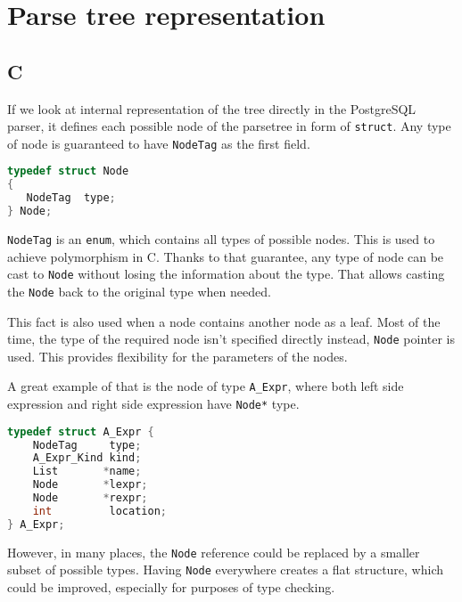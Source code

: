 \section{Parse tree representation}
\subsection{C}

If we look at internal representation of the tree directly in the PostgreSQL parser, it defines each possible node of the parsetree in form of \texttt{struct}. Any type of node is guaranteed to have \texttt{NodeTag} as the first field. 
\begin{lstlisting}[language=C, basicstyle=\ttfamily]      
typedef struct Node
{
   NodeTag  type;
} Node;
\end{lstlisting}
\texttt{NodeTag} is an \texttt{enum}, which contains all types of possible nodes. This is used to achieve polymorphism in C. Thanks to that guarantee, any type of node can be cast to \texttt{Node} without losing the information about the type. That allows casting the \texttt{Node} back to the original type when needed.

This fact is also used when a node contains another node as a leaf. Most of the time, the type of the required node isn't specified directly instead, \texttt{Node} pointer is used. This provides flexibility for the parameters of the nodes. 

A great example of that is the node of type \texttt{A\_Expr}, where both left side expression and right side expression have \texttt{Node*} type.
\begin{lstlisting}[language=C, basicstyle=\ttfamily]      
typedef struct A_Expr {
    NodeTag     type;
    A_Expr_Kind kind;
    List       *name; 
    Node       *lexpr; 
    Node       *rexpr; 
    int         location; 
} A_Expr;
\end{lstlisting}

However, in many places, the \texttt{Node} reference could be replaced by a smaller subset of possible types. Having \texttt{Node} everywhere creates a flat structure, which could be improved, especially for purposes of type checking. 

